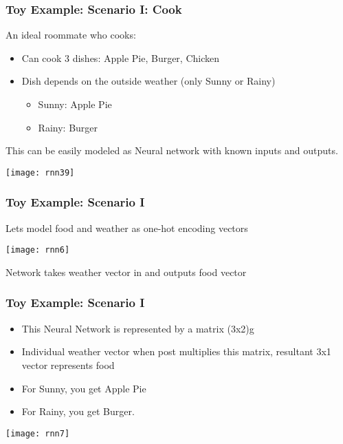 \begin{frame}[fragile] \frametitle{Toy Example: Scenario I: Cook}
An ideal roommate who cooks:
\begin{itemize}
\item Can cook 3 dishes: Apple Pie, Burger, Chicken
\item Dish depends on the outside weather (only Sunny or Rainy)
\begin{itemize}
\item Sunny: Apple Pie
\item Rainy: Burger
\end{itemize}
\end{itemize}
This can be easily modeled as Neural network with known inputs and outputs.


\begin{center}
\texttt{[image: rnn39]}
\end{center}



\end{frame}

\begin{frame}[fragile] \frametitle{Toy Example: Scenario I}
Lets model food and weather as one-hot encoding vectors
\begin{center}
\texttt{[image: rnn6]}
\end{center}
Network takes weather vector in and outputs food vector
\end{frame}

\begin{frame}[fragile] \frametitle{Toy Example: Scenario I}
\begin{itemize}
\item This Neural Network is represented by a matrix (3x2)g
\item Individual weather vector when post multiplies this matrix, resultant 3x1 vector represents food
\item For Sunny, you get Apple Pie
\item For Rainy, you get Burger.
\end{itemize}
\begin{center}
\texttt{[image: rnn7]}
\end{center}
\end{frame}

